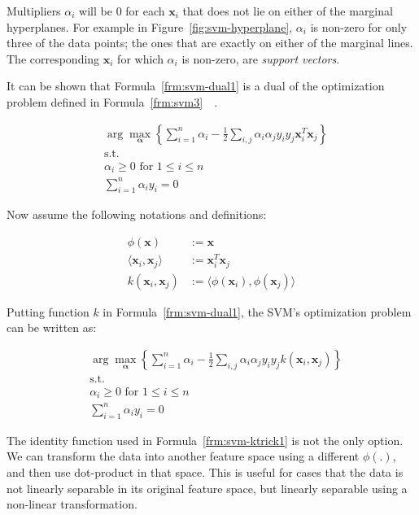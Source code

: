 Multipliers $\alpha_i$ will be $0$ for each $\mathbf{x}_i$ that does not lie on either of the marginal hyperplanes. For example in Figure~\ref{fig:svm-hyperplane}, $\alpha_i$ is non-zero for only three of the data points; the ones that are exactly on either of the marginal lines. The corresponding $\mathbf{x}_i$ for which $\alpha_i$ is non-zero, are \emph{support vectors}.

It can be shown that Formula~\ref{frm:svm-dual1} is a dual of the optimization problem defined in Formula~\ref{frm:svm3}~\cite[p. 14]{learning-with-kernels}~\cite[Ch. 5]{thenatureofstatisticallearningtheory}.

\begin{align}
  &\arg\max_{\boldsymbol{\alpha}}\left\{\sum_{i=1}^n \alpha_i - \frac{1}{2}\sum_{i, j} \alpha_i \alpha_j y_i y_j \mathbf{x}_i^T \mathbf{x}_j\right\} \nonumber \\
  &\text{s.t.} \nonumber \\
  &\alpha_i \geq 0 \text{ for } 1 \leq i \leq n \nonumber \\
  &\sum_{i=1}^{n}\alpha_i y_i = 0
  \label{frm:svm-dual1}
\end{align}

Now assume the following notations and definitions:

\begin{align}
  \phi(\mathbf{x}) &:= \mathbf{x} \nonumber \\
  \langle \mathbf{x}_i, \mathbf{x}_j \rangle &:= \mathbf{x}_i^T \mathbf{x}_j \nonumber \\
  k(\mathbf{x}_i, \mathbf{x}_j) &:= \langle \phi(\mathbf{x}_i), \phi(\mathbf{x}_j) \rangle
  \label{frm:svm-ktrick1}
\end{align}

Putting function $k$ in Formula~\ref{frm:svm-dual1}, the SVM's optimization problem can be written as:

\begin{align}
  &\arg\max_{\boldsymbol{\alpha}}\left\{\sum_{i=1}^n \alpha_i - \frac{1}{2}\sum_{i, j} \alpha_i \alpha_j y_i y_j k(\mathbf{x}_i, \mathbf{x}_j)\right\} \nonumber \\
  &\text{s.t.} \nonumber \\
  &\alpha_i \geq 0 \text{ for } 1 \leq i \leq n \nonumber \\
  &\sum_{i=1}^{n}\alpha_i y_i = 0
  \label{frm:svm-dual2}
\end{align}

The identity function used in Formula~\ref{frm:svm-ktrick1} is not the only option. We can transform the data into another feature space using a different $\phi(.)$, and then use dot-product in that space. This is useful for cases that the data is not linearly separable in its original feature space, but linearly separable using a non-linear transformation.

